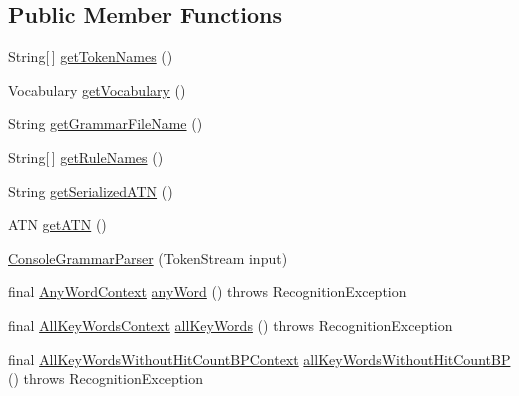 \subsection*{Public Member Functions}
\begin{DoxyCompactItemize}
\item 
String\mbox{[}$\,$\mbox{]} \hyperlink{classgov_1_1nasa_1_1jpf_1_1inspector_1_1client_1_1parser_1_1_console_grammar_parser_a4e5b24768326b84cd643950293aacf53}{get\+Token\+Names} ()
\item 
Vocabulary \hyperlink{classgov_1_1nasa_1_1jpf_1_1inspector_1_1client_1_1parser_1_1_console_grammar_parser_aba7119e5193c794b335592d7bc18cd22}{get\+Vocabulary} ()
\item 
String \hyperlink{classgov_1_1nasa_1_1jpf_1_1inspector_1_1client_1_1parser_1_1_console_grammar_parser_aba7ba816973ea9326eedd7664592769a}{get\+Grammar\+File\+Name} ()
\item 
String\mbox{[}$\,$\mbox{]} \hyperlink{classgov_1_1nasa_1_1jpf_1_1inspector_1_1client_1_1parser_1_1_console_grammar_parser_a4467603609bfedc40c45fe9b9846390b}{get\+Rule\+Names} ()
\item 
String \hyperlink{classgov_1_1nasa_1_1jpf_1_1inspector_1_1client_1_1parser_1_1_console_grammar_parser_a54b727dc1425d638a3626748953ccdae}{get\+Serialized\+A\+TN} ()
\item 
A\+TN \hyperlink{classgov_1_1nasa_1_1jpf_1_1inspector_1_1client_1_1parser_1_1_console_grammar_parser_a86335c1ccd5bac39413f22598e51d8e1}{get\+A\+TN} ()
\item 
\hyperlink{classgov_1_1nasa_1_1jpf_1_1inspector_1_1client_1_1parser_1_1_console_grammar_parser_a03e28f396e991cff9d014f357ae220f3}{Console\+Grammar\+Parser} (Token\+Stream input)
\item 
final \hyperlink{classgov_1_1nasa_1_1jpf_1_1inspector_1_1client_1_1parser_1_1_console_grammar_parser_1_1_any_word_context}{Any\+Word\+Context} \hyperlink{classgov_1_1nasa_1_1jpf_1_1inspector_1_1client_1_1parser_1_1_console_grammar_parser_a33a50c0e5499145e26945de763b14c70}{any\+Word} ()  throws Recognition\+Exception 
\item 
final \hyperlink{classgov_1_1nasa_1_1jpf_1_1inspector_1_1client_1_1parser_1_1_console_grammar_parser_1_1_all_key_words_context}{All\+Key\+Words\+Context} \hyperlink{classgov_1_1nasa_1_1jpf_1_1inspector_1_1client_1_1parser_1_1_console_grammar_parser_ae08871adf83e51273a2c368571fabd6a}{all\+Key\+Words} ()  throws Recognition\+Exception 
\item 
final \hyperlink{classgov_1_1nasa_1_1jpf_1_1inspector_1_1client_1_1parser_1_1_console_grammar_parser_1_1_all_key_4612626c1f72cea22831f9624187dc64}{All\+Key\+Words\+Without\+Hit\+Count\+B\+P\+Context} \hyperlink{classgov_1_1nasa_1_1jpf_1_1inspector_1_1client_1_1parser_1_1_console_grammar_parser_a800f8f87a8c2b4569bab4a7074239325}{all\+Key\+Words\+Without\+Hit\+Count\+BP} ()  throws Recognition\+Exception 

\end{DoxyCompactItemize}
